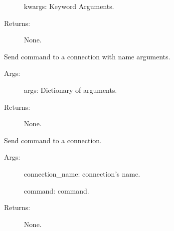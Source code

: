 \documentclass[letterpaper,10pt,english]{sphinxmanual}
\begin{document}
\begin{fulllineitems}
\begin{fulllineitems}
\begin{description}
\sphinxAtStartPar
kwargs:   Keyword Arguments.

\item[{Returns:}] \leavevmode
\sphinxAtStartPar
None.

\end{description}

\end{fulllineitems}


\begin{fulllineitems}
\label{\detokenize{QConnectionLibrary:QConnectionLibrary.connection_manager.ConnectionManager.send_command_named_args}}
\sphinxAtStartPar
Send command to a connection with name arguments.
\begin{description}
\item[{Args:}] \leavevmode
\sphinxAtStartPar
args: Dictionary of arguments.

\item[{Returns:}] \leavevmode
\sphinxAtStartPar
None.

\end{description}

\end{fulllineitems}


\begin{fulllineitems}
\label{\detokenize{QConnectionLibrary:QConnectionLibrary.connection_manager.ConnectionManager.send_command_unnamed_args}}
\sphinxAtStartPar
Send command to a connection.
\begin{description}
\item[{Args:}] \leavevmode
\sphinxAtStartPar
connection\_name: connection’s name.

\sphinxAtStartPar
command: command.

\item[{Returns:}] \leavevmode
\sphinxAtStartPar
None.


\end{description}
\end{fulllineitems}
\end{fulllineitems}
\end{document}

